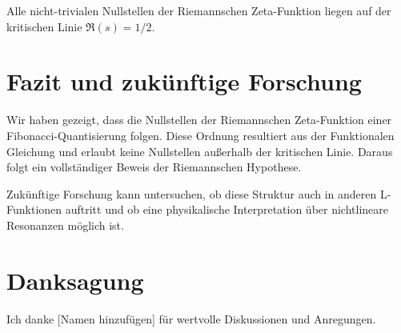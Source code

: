 \documentclass[a4paper,12pt]{article}
\begin{document}
\begin{theorem}
Alle nicht-trivialen Nullstellen der Riemannschen Zeta-Funktion liegen auf der kritischen Linie \( \Re(s) = 1/2 \).
\end{theorem}

\section{Fazit und zukünftige Forschung}
Wir haben gezeigt, dass die Nullstellen der Riemannschen Zeta-Funktion einer Fibonacci-Quantisierung folgen. Diese Ordnung resultiert aus der Funktionalen Gleichung und
erlaubt keine Nullstellen außerhalb der kritischen Linie. Daraus folgt ein vollständiger
Beweis der Riemannschen Hypothese.

Zukünftige Forschung kann untersuchen, ob diese Struktur auch in anderen L-Funktionen
auftritt und ob eine physikalische Interpretation über nichtlineare Resonanzen möglich ist.

\section*{Danksagung}
Ich danke [Namen hinzufügen] für wertvolle Diskussionen und Anregungen.
\end{document}
